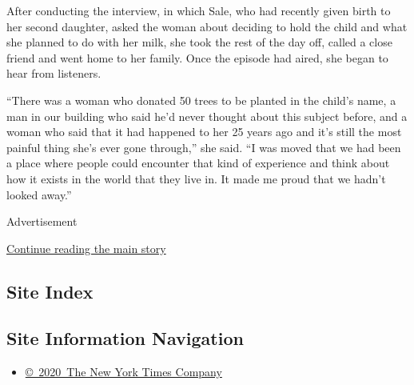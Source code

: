 After conducting the interview, in which Sale, who had recently given
birth to her second daughter, asked the woman about deciding to hold the
child and what she planned to do with her milk, she took the rest of the
day off, called a close friend and went home to her family. Once the
episode had aired, she began to hear from listeners.

``There was a woman who donated 50 trees to be planted in the child's
name, a man in our building who said he'd never thought about this
subject before, and a woman who said that it had happened to her 25
years ago and it's still the most painful thing she's ever gone
through,'' she said. ``I was moved that we had been a place where people
could encounter that kind of experience and think about how it exists in
the world that they live in. It made me proud that we hadn't looked
away.''

Advertisement

\protect\hyperlink{after-bottom}{Continue reading the main story}

\hypertarget{site-index}{%
\subsection{Site Index}\label{site-index}}

\hypertarget{site-information-navigation}{%
\subsection{Site Information
Navigation}\label{site-information-navigation}}

\begin{itemize}
\tightlist
\item
  \href{https://help.nytimes.com/hc/en-us/articles/115014792127-Copyright-notice}{©~2020~The
  New York Times Company}
\end{itemize}

